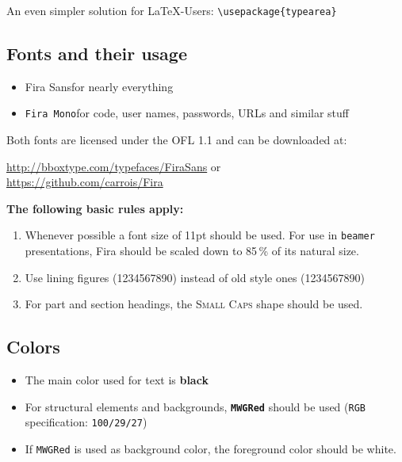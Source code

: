 \documentclass[DIV=12,abstracton]{scrartcl}
\begin{document}
    An even simpler solution for \LaTeX-Users: \verb|\usepackage{typearea}|
    
    
    \subsection{Fonts and their usage}
    \begin{itemize}\itemsep0pt
        \item Fira Sans\quad for nearly everything
        \item \texttt{Fira Mono}\quad for code, user names, passwords, URLs and similar stuff
    \end{itemize}
    
    \medskip
    Both fonts are licensed under the OFL 1.1 and can be downloaded at:
    \begin{center}
        \url{http://bboxtype.com/typefaces/FiraSans} or \\
        \url{https://github.com/carrois/Fira}
    \end{center}
    
    \medskip
    \textbf{The following basic rules apply:} \nopagebreak
    \begin{enumerate}
        \item Whenever possible a font size of 11pt should be used.
            For use in \texttt{beamer} presentations, Fira should be scaled down to 85\,\% of its natural size.
        
        \item Use lining figures (1234567890) instead of old style ones (1234567890)
        
        \item For part and section headings, the \textsc{Small Caps} shape should be used.
    \end{enumerate}
    
    
    \subsection{Colors}
    \begin{itemize}
        \item The main color used for text is \textbf{black}
        \item For structural elements and backgrounds, \textbf{\color{MWGRed}\texttt{MWGRed}} should be used (\texttt{RGB} specification: \texttt{100/29/27})
        \item If {\color{MWGRed}\texttt{MWGRed}} is used as background color, the foreground color should be white.
    \end{itemize}
    
    
\end{document}
